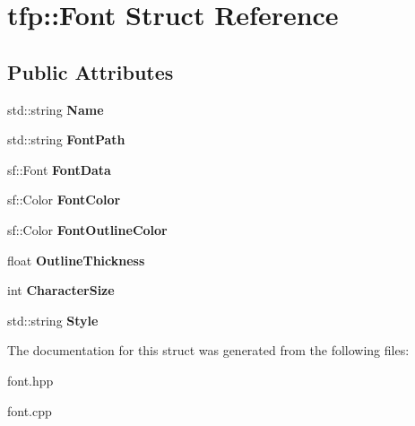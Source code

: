 \hypertarget{structtfp_1_1_font}{}\section{tfp\+:\+:Font Struct Reference}
\label{structtfp_1_1_font}
\subsection*{Public Attributes}
\begin{DoxyCompactItemize}
\item 
\mbox{\label{structtfp_1_1_font_a76a1c07acbe4c3417dba7be0e16ea25c}} 
std\+::string {\bfseries Name}
\item 
\mbox{\label{structtfp_1_1_font_aaa43a70c6a4c40c8bfaa9ef121862639}} 
std\+::string {\bfseries Font\+Path}
\item 
\mbox{\label{structtfp_1_1_font_aeb2340a0f6200a08e788ed927d4c10c6}} 
sf\+::\+Font {\bfseries Font\+Data}
\item 
\mbox{\label{structtfp_1_1_font_a685edfd7caab1ace61507823e184f692}} 
sf\+::\+Color {\bfseries Font\+Color}
\item 
\mbox{\label{structtfp_1_1_font_a4205c267bb8225e393cc389bf2807f4e}} 
sf\+::\+Color {\bfseries Font\+Outline\+Color}
\item 
\mbox{\label{structtfp_1_1_font_a3f519d8af144564534f726d59aa648e0}} 
float {\bfseries Outline\+Thickness}
\item 
\mbox{\label{structtfp_1_1_font_a9cda49fc72073b3efe557988b4135e53}} 
int {\bfseries Character\+Size}
\item 
\mbox{\label{structtfp_1_1_font_ac1c985c69291ec7336c99bcddf7434ed}} 
std\+::string {\bfseries Style}
\end{DoxyCompactItemize}


The documentation for this struct was generated from the following files\+:\begin{DoxyCompactItemize}
\item 
font.\+hpp\item 
font.\+cpp\end{DoxyCompactItemize}
